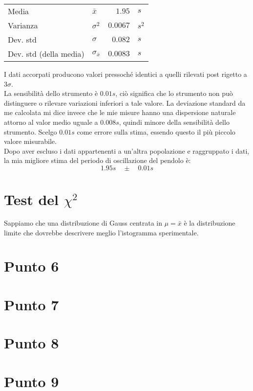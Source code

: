 \documentclass{article}
\begin{document}
	\vspace{0.8cm}
	\begin{table}[hb]
		\centering
		\begin{tabular}{llrl}
			Media                       & $\bar{x}$             & $1.95$        & $s$       \\
			Varianza                    & $\sigma ^ 2$          & $0.0067$     & $s^2$  \\
			Dev. std                    & $\sigma$              & $0.082$      & $s$   \\
			Dev. std (della media)      & $\sigma_{\bar{x}}$    & $0.0083$     & $s$    
		\end{tabular}
	\end{table}
	\vspace{0.5cm}
	
	\noindent
	I dati accorpati producono valori pressoché identici a quelli rilevati post rigetto a $3\sigma$. \\
	
	
	\noindent
	La sensibilità dello strumento è $0.01s$, ciò significa che lo strumento non può distinguere o rilevare variazioni inferiori a tale valore. La deviazione standard da me calcolata mi dice invece che le mie misure hanno una dispersione naturale attorno al valor medio uguale a $0.008s$, quindi minore della sensibilità dello strumento. Scelgo $0.01s$ come errore sulla stima, essendo questo il più piccolo valore misurabile. \\
	
	
	\noindent
	Dopo aver escluso i dati appartenenti a un'altra popolazione e raggruppato i dati, la mia migliore stima del  periodo di oscillazione del pendolo è:
	\[
	1.95s \quad \pm \quad 0.01 s
	\]
	
	
	
	
	
	\newpage
	\section{Test del $\chi ^2$}
	
	Sappiamo che una distribuzione di Gauss centrata in $\mu = \bar{x}$ è la distribuzione limite che dovrebbe descrivere meglio l'istogramma sperimentale.
	
	
	
	\newpage
	\section{Punto 6}
	
	\newpage
	\section{Punto 7}
	\newpage
	\section{Punto 8}
	
	\newpage
	\section{Punto 9}
	
	
	
\end{document}

